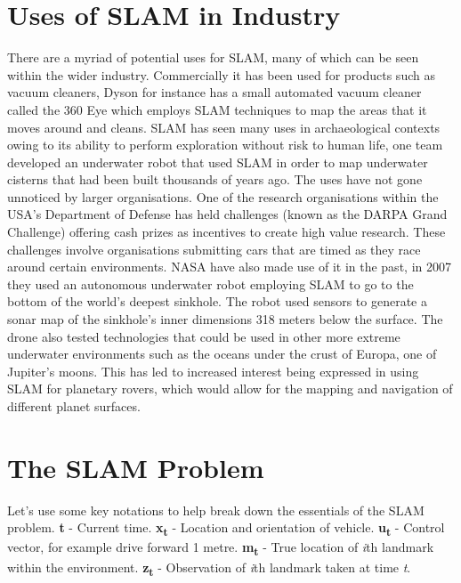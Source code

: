 			\section{Uses of SLAM in Industry}
			There are a myriad of potential uses for SLAM, many of which can be seen within the wider industry. Commercially it has been used for products such as vacuum cleaners, Dyson for instance has a small automated vacuum cleaner called the 360 Eye which employs SLAM techniques to map the areas that it moves around and cleans. SLAM has seen many uses in archaeological contexts owing to its ability to perform exploration without risk to human life, one team \citep{clark2008archaeology} developed an underwater robot that used SLAM in order to map underwater cisterns that had been built thousands of years ago. The uses have not gone unnoticed by larger organisations. One of the research organisations within the USA's Department of Defense has held challenges (known as the DARPA Grand Challenge) offering cash prizes as incentives to create high value research. These challenges involve organisations submitting cars that are timed as they race around certain environments. NASA have also made use of it in the past, in 2007 they used an autonomous underwater robot \citep{carnegie2007sinkhole} employing SLAM to go to the bottom of the world's deepest sinkhole. The robot used sensors to generate a sonar map of the sinkhole's inner dimensions 318 meters below the surface.  The drone also tested technologies that could be used in other more extreme underwater environments such as the oceans under the crust of Europa, one of Jupiter's moons. This has led to increased interest being expressed in using SLAM for planetary rovers, which would allow for the mapping and navigation of different planet surfaces.
			\medskip
		
			\section{The SLAM Problem}
			Let's use some key notations to help break down the essentials of the SLAM problem. \newline
			\textbf{t} - Current time. \newline
			\textbf{x\textsubscript{t}} - Location and orientation of vehicle. \newline
			\textbf{u\textsubscript{t}} - Control vector, for example drive forward 1 metre.  \newline
			\textbf{m\textsubscript{t}} - True location of \textit{i}th landmark within the environment. \newline
			\textbf{z\textsubscript{t}} - Observation of \textit{i}th landmark taken at time \textit{t}.\newline
			
